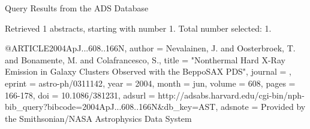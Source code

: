Query Results from the ADS Database


Retrieved 1 abstracts, starting with number 1.  Total number selected: 1.

@ARTICLE{2004ApJ...608..166N,
   author = {{Nevalainen}, J. and {Oosterbroek}, T. and {Bonamente}, M. and 
	{Colafrancesco}, S.},
    title = "{Nonthermal Hard X-Ray Emission in Galaxy Clusters Observed with the BeppoSAX PDS}",
  journal = {\apj},
   eprint = {astro-ph/0311142},
     year = 2004,
    month = jun,
   volume = 608,
    pages = {166-178},
      doi = {10.1086/381231},
   adsurl = {http://adsabs.harvard.edu/cgi-bin/nph-bib_query?bibcode=2004ApJ...608..166N&db_key=AST},
  adsnote = {Provided by the Smithsonian/NASA Astrophysics Data System}
}


